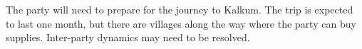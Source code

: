 The party will need to prepare for the journey to Kalkum.
The trip is expected to last one month, but there are villages along the way where the party can buy supplies.
Inter-party dynamics may need to be resolved.
